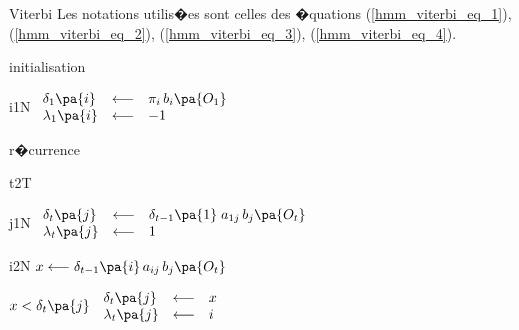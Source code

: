         \begin{xalgorithm}{Viterbi}\label{hmm_algo_viterbi_etat}
        Les notations utilis�es sont celles des �quations (\ref{hmm_viterbi_eq_1}), (\ref{hmm_viterbi_eq_2}),
        (\ref{hmm_viterbi_eq_3}), (\ref{hmm_viterbi_eq_4}).
        
        \begin{xalgostep}{initialisation}\label{hmm_viterbi_step_a}
                \begin{xfor}{i}{1}{N}
                $
                \begin{array}{lll}
                \delta_1\pa{i}  &\longleftarrow& \pi_i \, b_i\pa{O_1} \\
                \lambda_1\pa{i} &\longleftarrow& -1
                \end{array}
                $
                \end{xfor}
        \end{xalgostep}
        
        \begin{xalgostep}{r�currence}\label{hmm_viterbi_step_b}
                \begin{xfor}{t}{2}{T}
                        \begin{xfor}{j}{1}{N}
                                $
                                \begin{array}{lll}
                                \delta_t\pa{j}  &\longleftarrow& \delta_{t-1}\pa{1} \; a_{1j} \, b_j\pa{O_t} \\
                                \lambda_t\pa{j} &\longleftarrow& 1
                                \end{array}
                                $ \\
                                \begin{xfor}{i}{2}{N}
                                        $x \longleftarrow \delta_{t-1}\pa{i} \, a_{ij} \, b_j\pa{O_t}$ \\
                                        \begin{xif}{$x < \delta_t\pa{j}$}
                                                $
                                                \begin{array}{lll}
                                                \delta_t\pa{j}  &\longleftarrow& x \\
                                                \lambda_t\pa{j} &\longleftarrow& i
                                                \end{array}
                                                $
                                        \end{xif}
                                \end{xfor}
                        \end{xfor}
                \end{xfor}
        \end{xalgostep}
        

\end{xalgorithm}
